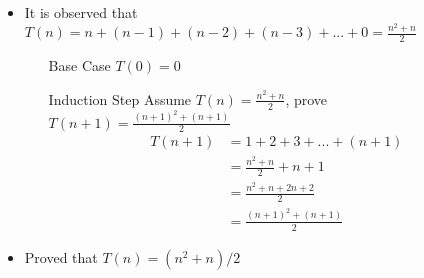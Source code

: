 \documentclass{article}
\def\math#1{$#1$}
\begin{document}
\begin{itemize}
    \item It is observed that \math{T(n) = n + (n-1) + (n-2) + (n-3) + ... + 0 = \frac{n^2+n}{2}}
    \item []
        \begin{itemize}
            \item [Base Case] \math{T(0) = 0}
            \item [Induction Step] Assume \math{T(n) = \frac{n^2+n}{2}}, prove \math{T(n+1) = \frac{(n+1)^2 + (n+1)}{2}} \\
                \begin{equation}
                    \begin{split}
        T(n+1) &= 1 + 2 + 3 +... + (n + 1) \\
        &= \frac{n^2+n}{2} + n + 1 \\
        &= \frac{n^2 + n + 2n + 2}{2} \\
        &= \frac{(n+1)^2+(n+1)}{2}
                    \end{split}
                \end{equation}
        \end{itemize}
    \item Proved that \math{T(n) = (n^2 + n) / 2}
\end{itemize}
\end{document}
